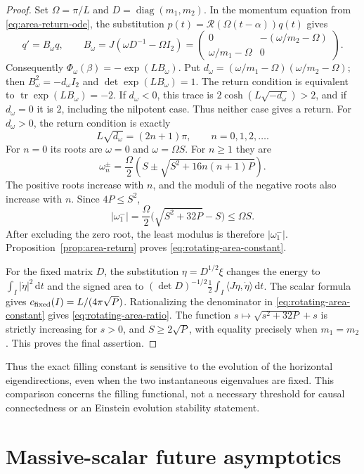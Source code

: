 \documentclass[10pt,a4paper]{article}
\numberwithin{equation}{section}
\theoremstyle{definition}
\theoremstyle{remark}
\newcommand{\dd}{\mathrm d}
\begin{document}
\begin{proof}
Set $\Omega=\pi/L$ and $D=\operatorname{diag}(m_1,m_2)$.
In the momentum equation from \eqref{eq:area-return-ode}, the substitution
$p(t)=\mathcal R(\Omega(t-\alpha))q(t)$ gives
\[
 q'=B_\omega q,\qquad
 B_\omega=J(\omega D^{-1}-\Omega I_2)
 =\begin{pmatrix}
 0&-(\omega/m_2-\Omega)\\
 \omega/m_1-\Omega&0
 \end{pmatrix}.
\]
Consequently
$\Phi_\omega(\beta)=-\exp(LB_\omega)$.  Put
$d_\omega=(\omega/m_1-\Omega)(\omega/m_2-\Omega)$; then
$B_\omega^2=-d_\omega I_2$ and
$\det\exp(LB_\omega)=1$.  The return condition is equivalent to
$\operatorname{tr}\exp(LB_\omega)=-2$.
If $d_\omega<0$, this trace is
$2\cosh(L\sqrt{-d_\omega})>2$, and if $d_\omega=0$ it is $2$,
including the nilpotent case.  Thus neither case gives a return.
For $d_\omega>0$, the return condition is exactly
\[
 L\sqrt{d_\omega}=(2n+1)\pi,
 \qquad n=0,1,2,\ldots.
\]
For $n=0$ its roots are $\omega=0$ and $\omega=\Omega S$.
For $n\ge1$ they are
\[
 \omega_n^\pm=\frac\Omega2
 \left(S\pm\sqrt{S^2+16n(n+1)P}\right).
\]
The positive roots increase with $n$, and the moduli of the negative
roots also increase with $n$.  Since $4P\le S^2$,
\[
 |\omega_1^-|
 =\frac\Omega2\bigl(\sqrt{S^2+32P}-S\bigr)
 \le\Omega S.
\]
After excluding the zero root, the least modulus is therefore
$|\omega_1^-|$.  Proposition~\ref{prop:area-return} proves
\eqref{eq:rotating-area-constant}.

For the fixed matrix $D$, the substitution $\eta=D^{1/2}\xi$ changes
the energy to $\int_I|\dot\eta|^2\,\dd t$ and the signed area to
$(\det D)^{-1/2}\frac12\int_I\langle J\eta,\dot\eta\rangle\,\dd t$.
The scalar formula gives $c_{\rm fixed}(I)=L/(4\pi\sqrt P)$.
Rationalizing the denominator in \eqref{eq:rotating-area-constant}
gives \eqref{eq:rotating-area-ratio}.  The function
$s\mapsto\sqrt{s^2+32P}+s$ is strictly increasing for $s>0$,
and $S\ge2\sqrt P$, with equality precisely when $m_1=m_2$.
This proves the final assertion.
\end{proof}

Thus the exact filling constant is sensitive to the evolution of the
horizontal eigendirections, even when the two instantaneous eigenvalues
are fixed.  This comparison concerns the filling functional, not a
necessary threshold for causal connectedness or an Einstein evolution
stability statement.

\section{Massive-scalar future asymptotics}
\label{app:massive-future}
\end{document}
